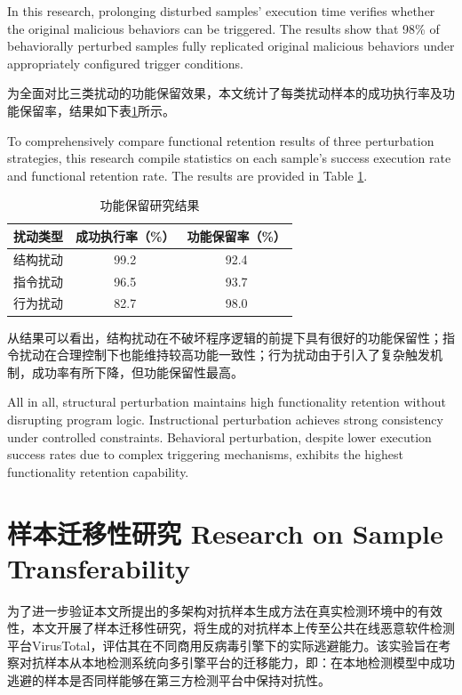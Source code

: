 In this research, prolonging disturbed samples' execution time verifies whether the original malicious behaviors can be triggered. The results show that 98\% of behaviorally perturbed samples fully replicated original malicious behaviors under appropriately configured trigger conditions.

为全面对比三类扰动的功能保留效果，本文统计了每类扰动样本的成功执行率及功能保留率，结果如下表\ref{tab:5.12}所示。

To comprehensively compare functional retention results of three perturbation strategies, this research compile statistics on each sample's success execution rate and functional retention rate. The results are provided in Table \ref{tab:5.12}.

\begin{table}[htb]
	\centering
	\caption{功能保留研究结果}
	\label{tab:5.12}
	\begin{tabular*}{0.9\textwidth}{@{\extracolsep{\fill}}ccc}
		\toprule
		扰动类型 & 成功执行率（\%） & 功能保留率（\%） \\
		\midrule
		结构扰动 & 99.2 & 92.4 \\
		指令扰动 & 96.5 & 93.7 \\
		行为扰动 & 82.7 & 98.0 \\
		\bottomrule
	\end{tabular*}
\end{table}

从结果可以看出，结构扰动在不破坏程序逻辑的前提下具有很好的功能保留性；指令扰动在合理控制下也能维持较高功能一致性；行为扰动由于引入了复杂触发机制，成功率有所下降，但功能保留性最高。

All in all, structural perturbation maintains high functionality retention without disrupting program logic. Instructional perturbation achieves strong consistency under controlled constraints. Behavioral perturbation, despite lower execution success rates due to complex triggering mechanisms, exhibits the highest functionality retention capability.

\section{样本迁移性研究 Research on Sample Transferability}

为了进一步验证本文所提出的多架构对抗样本生成方法在真实检测环境中的有效性，本文开展了样本迁移性研究，将生成的对抗样本上传至公共在线恶意软件检测平台VirusTotal，评估其在不同商用反病毒引擎下的实际逃避能力。该实验旨在考察对抗样本从本地检测系统向多引擎平台的迁移能力，即：在本地检测模型中成功逃避的样本是否同样能够在第三方检测平台中保持对抗性。

